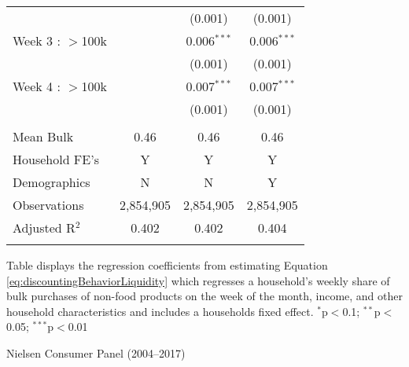 \begin{table}[!htbp]
{\begin{tabular}{@{\extracolsep{5pt}}lccc}
  &  & (0.001) & (0.001) \\
  Week 3 : $>$100k &  & 0.006$^{***}$ & 0.006$^{***}$ \\
  &  & (0.001) & (0.001) \\
  Week 4 : $>$100k &  & 0.007$^{***}$ & 0.007$^{***}$ \\
  &  & (0.001) & (0.001) \\
 \hline \\[-1.8ex]
Mean Bulk & 0.46 & 0.46 & 0.46 \\
Household FE's & Y & Y & Y \\
Demographics & N & N & Y \\
Observations & 2,854,905 & 2,854,905 & 2,854,905 \\
Adjusted R$^{2}$ & 0.402 & 0.402 & 0.404 \\
\hline
\hline \\[-1.8ex]
\end{tabular}
}
\begin{tablenotes}
Table displays the regression coefficients from estimating Equation \ref{eq:discountingBehaviorLiquidity} which regresses a household's weekly share of bulk purchases of non-food products on the week of the month, income, and other household characteristics and includes a households fixed effect. $^{*}$p$<$0.1; $^{**}$p$<$0.05; $^{***}$p$<$0.01
\end{tablenotes}
\begin{tablenotes}[Source]
Nielsen Consumer Panel (2004--2017)
\end{tablenotes}
\end{table}
